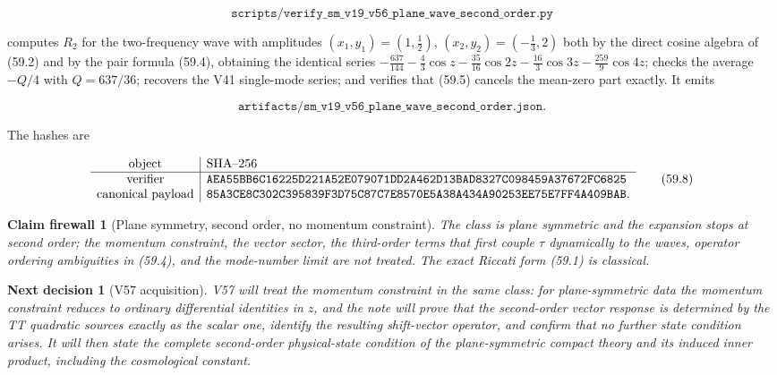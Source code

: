 \documentclass[11pt]{article}
\newtheorem{firewall}[theorem]{Claim firewall}
\newtheorem{decision}[theorem]{Next decision}
\theoremstyle{remark}
\begin{document}
\[
 \texttt{scripts/verify\_sm\_v19\_v56\_plane\_wave\_second\_order.py}
                                                                    \tag{59.6}
\]

computes \(R_2\) for the two-frequency wave with amplitudes
\((x_1,y_1)=(1,\tfrac12)\), \((x_2,y_2)=(-\tfrac13,2)\) both by the
direct cosine algebra of (59.2) and by the pair formula (59.4),
obtaining the identical series
\(-\tfrac{637}{144}-\tfrac43\cos z-\tfrac{35}{16}\cos2z-\tfrac{16}3\cos3z-\tfrac{259}9\cos4z\);
checks the average \(-Q/4\) with \(Q=637/36\); recovers the V41
single-mode series; and verifies that (59.5) cancels the mean-zero
part exactly.  It emits

\[
 \texttt{artifacts/sm\_v19\_v56\_plane\_wave\_second\_order.json}.   \tag{59.7}
\]

The hashes are

\[
\begin{array}{c|l}
\hbox{object}&\hbox{SHA--256}\\ \hline
\hbox{verifier}&
\texttt{AEA55BB6C16225D221A52E079071DD2A462D13BAD8327C098459A37672FC6825}\\
\hbox{canonical payload}&
\texttt{85A3CE8C302C395839F3D75C87C7E8570E5A38A434A90253EE75E7FF4A409BAB}.
\end{array}                                                     \tag{59.8}
\]

\begin{firewall}[Plane symmetry, second order, no momentum constraint]
\label{fire:v19v56}
The class is plane symmetric and the expansion stops at second order;
the momentum constraint, the vector sector, the third-order terms that
first couple \(\tau\) dynamically to the waves, operator ordering
ambiguities in (59.4), and the mode-number limit are not treated.
The exact Riccati form (59.1) is classical.
\end{firewall}

\begin{decision}[V57 acquisition]
\label{dec:v19v56-next}
V57 will treat the momentum constraint in the same class: for
plane-symmetric data the momentum constraint reduces to ordinary
differential identities in \(z\), and the note will prove that the
second-order vector response is determined by the TT quadratic sources
exactly as the scalar one, identify the resulting shift-vector operator,
and confirm that no further state condition arises.  It will then
state the complete second-order physical-state condition of the
plane-symmetric compact theory and its induced inner product,
including the cosmological constant.
\end{decision}
\end{document}
